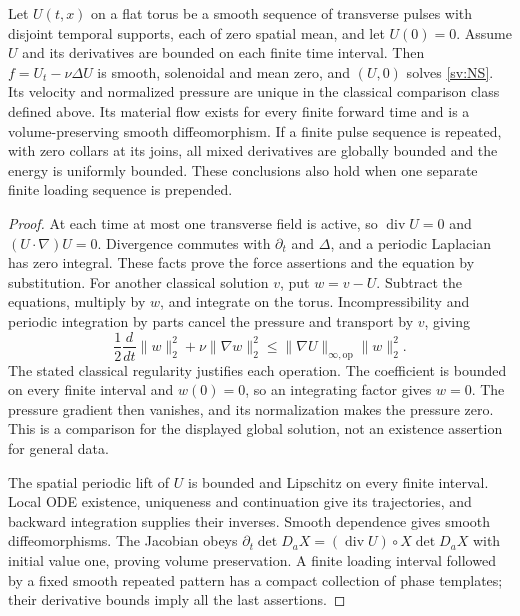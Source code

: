 \begin{lemma}\label{sv:force}
Let $U(t,x)$ on a flat torus be a smooth sequence of transverse pulses
with disjoint temporal supports, each of zero spatial mean, and let
$U(0)=0$.  Assume $U$ and its derivatives are bounded on each finite
time interval.  Then $f=U_t-\nu\Delta U$ is smooth, solenoidal and
mean zero, and $(U,0)$ solves \eqref{sv:NS}.  Its velocity and normalized
pressure are unique in the classical comparison class defined above.
Its material flow exists for every finite forward time and is a
volume-preserving smooth diffeomorphism.  If a finite pulse sequence is
repeated, with zero collars at its joins, all mixed derivatives are
globally bounded and the energy is uniformly bounded.  These conclusions
also hold when one separate finite loading sequence is prepended.
\end{lemma}
\begin{proof}
At each time at most one transverse field is active, so
$\operatorname{div}U=0$ and $(U\cdot\nabla)U=0$.
Divergence commutes with $\partial_t$ and $\Delta$, and a periodic
Laplacian has zero integral.  These facts prove the force assertions and
the equation by substitution.  For another classical solution $v$, put
$w=v-U$.  Subtract the equations, multiply by $w$, and integrate on
the torus.  Incompressibility and periodic integration by parts cancel
the pressure and transport by $v$, giving
\[
 \frac12\frac d{dt}\|w\|_2^2+\nu\|\nabla w\|_2^2
 \le\|\nabla U\|_{\infty,\mathrm{op}}\|w\|_2^2.
\]
The stated classical regularity justifies each operation.  The coefficient
is bounded on every finite interval and $w(0)=0$, so an integrating
factor gives $w=0$.  The pressure gradient then vanishes, and its
normalization makes the pressure zero.  This is a comparison for the
displayed global solution, not an existence assertion for general data.

The spatial periodic lift of $U$ is bounded and Lipschitz on every
finite interval.  Local ODE existence, uniqueness and continuation give
its trajectories, and backward integration supplies their inverses.
Smooth dependence gives smooth diffeomorphisms.  The Jacobian obeys
$\partial_t\det D_aX=(\operatorname{div}U)\circ X\det D_aX$
with initial value one, proving volume preservation.  A finite loading
interval followed by a fixed smooth repeated pattern has a compact
collection of phase templates; their derivative bounds imply all the
last assertions.
\end{proof}

